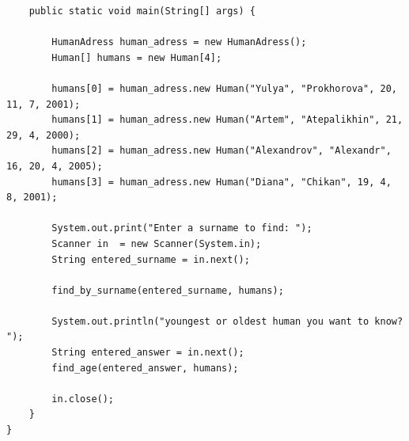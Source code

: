 \documentclass[a4paper]{article}
\begin{document}
\begin{lstlisting}
    public static void main(String[] args) {

        HumanAdress human_adress = new HumanAdress();
        Human[] humans = new Human[4];

        humans[0] = human_adress.new Human("Yulya", "Prokhorova", 20, 11, 7, 2001);
        humans[1] = human_adress.new Human("Artem", "Atepalikhin", 21, 29, 4, 2000);
        humans[2] = human_adress.new Human("Alexandrov", "Alexandr", 16, 20, 4, 2005);
        humans[3] = human_adress.new Human("Diana", "Chikan", 19, 4, 8, 2001);

        System.out.print("Enter a surname to find: ");
        Scanner in  = new Scanner(System.in);
        String entered_surname = in.next();
 
        find_by_surname(entered_surname, humans);

        System.out.println("youngest or oldest human you want to know? ");
        String entered_answer = in.next();
        find_age(entered_answer, humans);

        in.close();
    }
}

\end{lstlisting}
\end{document}
